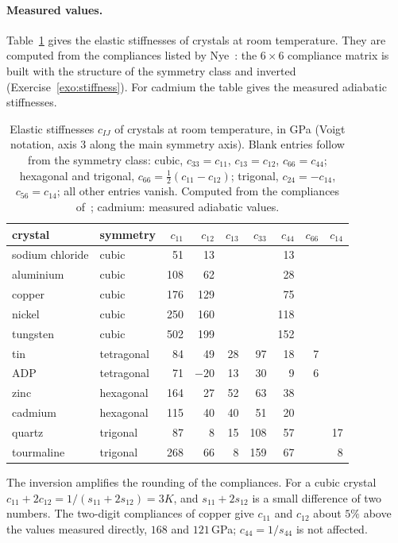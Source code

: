 \paragraph{Measured values.} Table~\ref{tab:el-stiffness} gives the elastic
%
stiffnesses of crystals at room temperature. They are computed from the
compliances listed by Nye~\cite{Nye1985}: the $6\times6$ compliance matrix
is built with the structure of the symmetry class and inverted
(Exercise~\ref{exo:stiffness}). For cadmium the table gives the measured
adiabatic stiffnesses.
\begin{table}[h]
\centering\small
\renewcommand{\arraystretch}{1.1}
\begin{tabular}{llrrrrrrr}
\toprule
\sffamily crystal & \sffamily symmetry & $c_{11}$ & $c_{12}$ & $c_{13}$ & $c_{33}$ & $c_{44}$ & $c_{66}$ & $c_{14}$\\
\midrule
sodium chloride & cubic      &  51 &  13   &     &     &  13 &     &    \\
aluminium       & cubic      & 108 &  62   &     &     &  28 &     &    \\
copper          & cubic      & 176 & 129   &     &     &  75 &     &    \\
nickel          & cubic      & 250 & 160   &     &     & 118 &     &    \\
tungsten        & cubic      & 502 & 199   &     &     & 152 &     &    \\
tin             & tetragonal &  84 &  49   &  28 &  97 &  18 &   7 &    \\
ADP             & tetragonal &  71 & $-20$ &  13 &  30 &   9 &   6 &    \\
zinc            & hexagonal  & 164 &  27   &  52 &  63 &  38 &     &    \\
cadmium         & hexagonal  & 115 &  40   &  40 &  51 &  20 &     &    \\
quartz          & trigonal   &  87 &   8   &  15 & 108 &  57 &     & 17 \\
tourmaline      & trigonal   & 268 &  66   &   8 & 159 &  67 &     &  8 \\
\bottomrule
\end{tabular}
\caption{Elastic stiffnesses $c_{IJ}$ of crystals at room temperature, in GPa
(Voigt notation, axis $3$ along the main symmetry axis). Blank entries follow
from the symmetry class: cubic, $c_{33}=c_{11}$, $c_{13}=c_{12}$,
$c_{66}=c_{44}$; hexagonal and trigonal, $c_{66}=\tfrac12(c_{11}-c_{12})$;
trigonal, $c_{24}=-c_{14}$, $c_{56}=c_{14}$; all other entries vanish.
Computed from the compliances of~\cite{Nye1985}; cadmium: measured adiabatic
values.}
\label{tab:el-stiffness}
\end{table}
The inversion amplifies the rounding of the compliances. For a cubic crystal
$c_{11}+2c_{12}=1/(s_{11}+2s_{12})=3K$, and $s_{11}+2s_{12}$ is a small
difference of two numbers. The two-digit compliances of copper give $c_{11}$
and $c_{12}$ about $5\%$ above the values measured directly, $168$ and
$121$\,GPa; $c_{44}=1/s_{44}$ is not affected.

